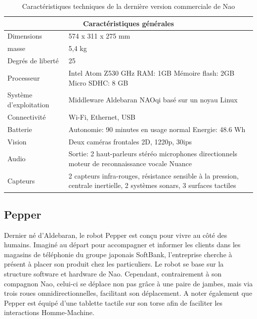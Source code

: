 \begin{table}[h]
	\begin{tabular}{ | l | p{10cm} | }
	\hline
	\multicolumn{2}{|c|}{Caractéristiques générales} \\
	\hline
	Dimensions & 574 x 311 x 275 mm \\
	\hline 
	masse & 5,4 kg \\
	\hline 
	Degrés de liberté  & 25 \\
	\hline
	Processeur & Intel Atom Z530 \newline 1.6 GHz \newline RAM: 1GB \newline Mémoire flash: 2GB  \newline Micro SDHC: 8 GB \\
	\hline
	Système d'exploitation & Middleware Aldebaran NAOqi basé sur un noyau Linux \\
	\hline
	Connectivité & Wi-Fi, Ethernet, USB \\
	\hline
	Batterie & Autonomie: 90 minutes en usage normal \newline Energie: 48.6 Wh \\
	\hline 
	Vision & Deux caméras frontales 2D, 1220p, 30ips \\
	\hline
	Audio & Sortie: 2 haut-parleurs stéréo \newline 4 microphones directionnels \newline moteur de reconnaissance vocale Nuance  \\
	\hline
	Capteurs & 2 capteurs infra-rouges, résistance sensible à la pression, centrale inertielle, 2 systèmes sonars, 3 surfaces tactiles \\
	\hline
	\end{tabular}
\caption[Caractéristiques technique de Nao]{Caractéristiques techniques de la dernière version commerciale  de Nao}
\label {tab: Caractéristiques technique de Nao}
\cite{NaoTech}
\end{table}

\subsection{Pepper}
\label{Entreprise: Les produits: Pepper}
Dernier né d'Aldebaran, le robot Pepper est conçu pour vivre au côté des humains. Imaginé au départ pour accompagner et informer les clients dans les magasins de téléphonie du groupe japonais SoftBank, l'entreprise cherche à présent à placer son produit chez les particuliers. Le robot se base sur la structure software et hardware de Nao. Cependant, contrairement à son compagnon Nao, celui-ci se déplace non pas grâce à une paire de jambes, mais via trois roues omnidirectionnelles, facilitant son déplacement. A noter également que Pepper est équipé d'une tablette tactile sur son torse afin de faciliter les interactions Homme-Machine.

